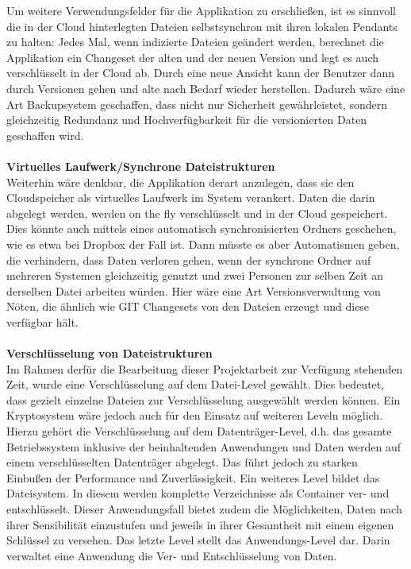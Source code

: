 \documentclass[13pt,a4paper,bibliography=totocnumbered,listof=totocnumbered]{scrartcl}
\begin{document}
Um weitere Verwendungsfelder für die Applikation zu erschließen, ist es sinnvoll die in der Cloud hinterlegten Dateien selbstsynchron mit ihren lokalen Pendants zu halten: Jedes Mal, wenn indizierte Dateien geändert werden, berechnet die Applikation ein Changeset der alten und der neuen Version und legt es auch verschlüsselt in der Cloud ab. Durch eine neue Ansicht kann der Benutzer dann durch Versionen gehen und alte nach Bedarf wieder herstellen. Dadurch wäre eine Art Backupsystem geschaffen, dass nicht nur Sicherheit gewährleistet, sondern gleichzeitig Redundanz und Hochverfügbarkeit für die versionierten Daten geschaffen wird.\\
\\\textbf{Virtuelles Laufwerk/Synchrone Dateistrukturen}\\
Weiterhin wäre denkbar, die Applikation derart anzulegen, dass sie den Cloudspeicher als virtuelles Laufwerk im System verankert. Daten die darin abgelegt werden, werden on the fly verschlüsselt und in der Cloud gespeichert. Dies könnte auch mittels eines automatisch synchronisierten Ordners geschehen, wie es etwa bei Dropbox der Fall ist. Dann müsste es aber Automatismen geben, die verhindern, dass Daten verloren gehen, wenn der synchrone Ordner auf mehreren Systemen gleichzeitig genutzt und zwei Personen zur selben Zeit an derselben Datei arbeiten würden. Hier wäre eine Art Versionsverwaltung von Nöten, die ähnlich wie GIT Changesets von den Dateien erzeugt und diese verfügbar hält.\\
\\\textbf{Verschlüsselung von Dateistrukturen}\\
Im Rahmen derfür die Bearbeitung dieser Projektarbeit zur Verfügung stehenden Zeit, wurde eine Verschlüsselung auf dem Datei-Level gewählt. Dies bedeutet, dass gezielt einzelne Dateien zur Verschlüsselung ausgewählt werden können. Ein Kryptosystem wäre jedoch auch für den Einsatz auf weiteren Leveln möglich. Hierzu gehört die Verschlüsselung auf dem Datenträger-Level, d.h. das gesamte Betriebssystem inklusive der beinhaltenden Anwendungen und Daten werden auf einem verschlüsselten Datenträger abgelegt. Das führt jedoch zu starken Einbußen der Performance und Zuverlässigkeit. Ein weiteres Level bildet das Dateisystem. In diesem werden komplette Verzeichnisse als Container ver- und entschlüsselt. Dieser Anwendungsfall bietet zudem die Möglichkeiten, Daten nach ihrer Sensibilität einzustufen und jeweils in ihrer Gesamtheit mit einem eigenen Schlüssel zu versehen. Das letzte Level stellt das Anwendungs-Level dar. Darin verwaltet eine Anwendung die Ver- und Entschlüsselung von Daten. \cite[S. 141f]{38}\\
\end{document}
